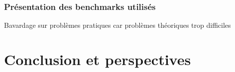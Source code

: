 \documentclass[a4paper,12pt,oneside]{extbook}
\begin{document}
\subsection{Présentation des benchmarks utilisés}
Bavardage sur problèmes pratiques car problèmes théoriques trop difficiles









\chapter{Conclusion et perspectives}\label{chap:conclusion}


%

\appendix

\printbibliography
\end{document}
